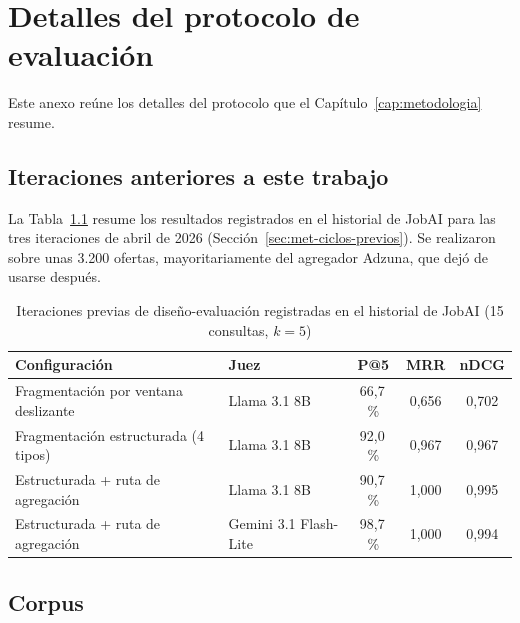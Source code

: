 
\chapter{Detalles del protocolo de evaluación}
\label{anx:protocolo}

Este anexo reúne los detalles del protocolo que el Capítulo~\ref{cap:metodologia} resume.

\section{Iteraciones anteriores a este trabajo}

La Tabla~\ref{tab:met-iteraciones} resume los resultados registrados en el historial de JobAI para las tres iteraciones de abril de 2026 (Sección~\ref{sec:met-ciclos-previos}). Se realizaron sobre unas 3.200 ofertas, mayoritariamente del agregador Adzuna, que dejó de usarse después.

\begin{table}[htbp!]
    \centering
    \caption{Iteraciones previas de diseño-evaluación registradas en el historial de JobAI (15 consultas, $k=5$)}
    \label{tab:met-iteraciones}
    \begin{tabular}{|p{6.2cm}|p{2.6cm}|c|c|c|}
        \hline
        \textbf{Configuración} & \textbf{Juez} & \textbf{P@5} & \textbf{MRR} & \textbf{nDCG} \\
        \hline
        Fragmentación por ventana deslizante & Llama 3.1 8B & 66,7\,\% & 0,656 & 0,702 \\
        \hline
        Fragmentación estructurada (4 tipos) & Llama 3.1 8B & 92,0\,\% & 0,967 & 0,967 \\
        \hline
        Estructurada + ruta de agregación & Llama 3.1 8B & 90,7\,\% & 1,000 & 0,995 \\
        \hline
        Estructurada + ruta de agregación & Gemini 3.1 Flash-Lite & 98,7\,\% & 1,000 & 0,994 \\
        \hline
    \end{tabular}
\end{table}

\section{Corpus}
\label{anx:corpus}

